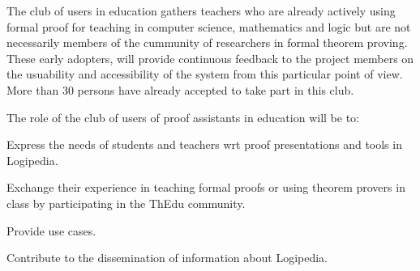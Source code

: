 \begin{workpackage}[id=dissemination,type=MGT,
  short={Dissemination, communication and exploitation},
  title={Dissemination, communication and exploitation},
  lead=Inr]
\begin{tasklist}
  \begin{task}[id=teachers-club,
      title=Expanding the use of Logipedia in education,
      lead=Str,StrRM=2,wphases=7-42!.05] The club of users in education gathers
    teachers who are already actively using formal proof for teaching
    in computer science, mathematics and logic but are not necessarily
    members of the cummunity of researchers in formal theorem
    proving. These early adopters, will provide continuous feedback to
    the project members on the usuability and accessibility of the
    system from this particular point of view.  More than 30 persons
    have already accepted to take part in this club.



    The role of the club of users of proof assistants in education will be to:
    \begin{compactitem}
    \item Express the needs of students and teachers wrt proof
      presentations and tools in Logipedia.
    \item Exchange their experience in teaching formal proofs or using
      theorem provers in class by participating in the ThEdu community.
    \item Provide use cases.
    \item Contribute to the dissemination of information about Logipedia.
    \end{compactitem}


\end{task}
\end{tasklist}
\end{workpackage}
